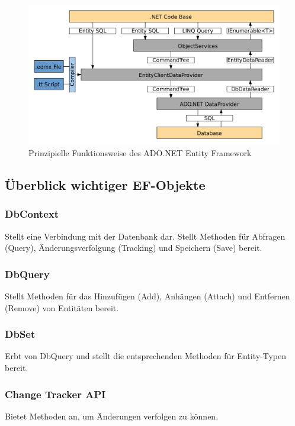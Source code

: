 \begin{figure}[h]
    \begin{center}
        \includegraphics*[width=16cm]{pics/ADO_NET_EF.png}
        \caption[Prinzipielle Funktionsweise des ADO.NET Entity Framework]{Prinzipielle Funktionsweise des ADO.NET Entity Framework \cite{AdoNetArchitecturePic}}
    \end{center}
\end{figure}

\subsection{Überblick wichtiger EF-Objekte}
\subsubsection{DbContext}
Stellt eine Verbindung mit der Datenbank dar. Stellt Methoden für Abfragen (Query),
Änderungsverfolgung (Tracking) und Speichern (Save) bereit.

\subsubsection{DbQuery}
Stellt Methoden für das Hinzufügen (Add), Anhängen (Attach) und Entfernen (Remove) von
Entitäten bereit.

\subsubsection{DbSet}
Erbt von DbQuery und stellt die entsprechenden Methoden für Entity-Typen bereit.

\subsubsection{Change Tracker API}
Bietet Methoden an, um Änderungen verfolgen zu können.

